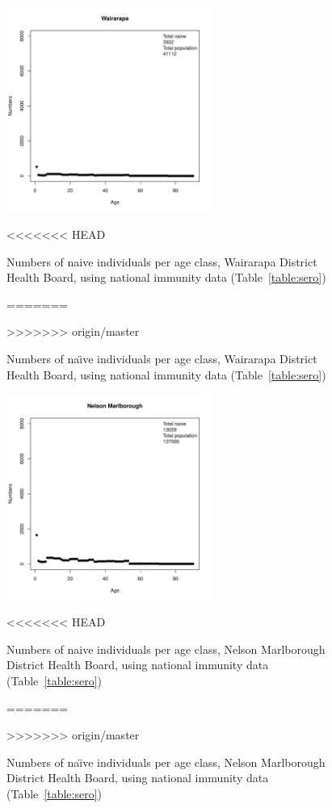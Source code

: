 \documentclass{article}
\begin{document}
\begin{itemize}
\begin{figure}[H]
     \begin{center}
     \includegraphics[width=0.6\textwidth]{dhb15.pdf}
     \end{center}
<<<<<<< HEAD
     \caption{Numbers of naive individuals per age class, Wairarapa District Health Board, using national immunity data (Table~\ref{table:sero})}
=======
     \caption{Numbers of na\"{\i}ve individuals per age class, Wairarapa District Health Board, using national immunity data (Table~\ref{table:sero})}
>>>>>>> origin/master
     \label{fig:Wairarapa}
\end{figure}

\begin{figure}[H]
     \begin{center}
     \includegraphics[width=0.6\textwidth]{dhb16.pdf}
     \end{center}
<<<<<<< HEAD
     \caption{Numbers of naive individuals per age class, Nelson Marlborough District Health Board, using national immunity data (Table~\ref{table:sero})}
=======
     \caption{Numbers of na\"{\i}ve individuals per age class, Nelson Marlborough District Health Board, using national immunity data (Table~\ref{table:sero})}
>>>>>>> origin/master
     \label{fig:NelsonMarlborough}
\end{figure}


\end{itemize}
\end{document}
